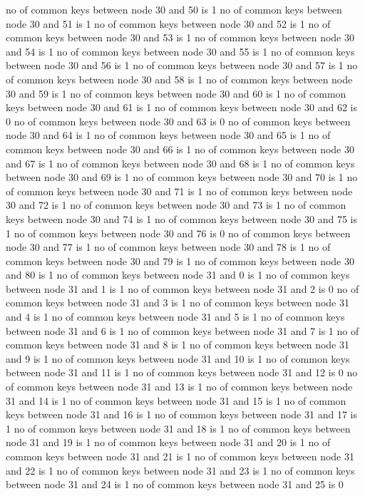 no of common keys between node 30 and 50 is 1
no of common keys between node 30 and 51 is 1
no of common keys between node 30 and 52 is 1
no of common keys between node 30 and 53 is 1
no of common keys between node 30 and 54 is 1
no of common keys between node 30 and 55 is 1
no of common keys between node 30 and 56 is 1
no of common keys between node 30 and 57 is 1
no of common keys between node 30 and 58 is 1
no of common keys between node 30 and 59 is 1
no of common keys between node 30 and 60 is 1
no of common keys between node 30 and 61 is 1
no of common keys between node 30 and 62 is 0
no of common keys between node 30 and 63 is 0
no of common keys between node 30 and 64 is 1
no of common keys between node 30 and 65 is 1
no of common keys between node 30 and 66 is 1
no of common keys between node 30 and 67 is 1
no of common keys between node 30 and 68 is 1
no of common keys between node 30 and 69 is 1
no of common keys between node 30 and 70 is 1
no of common keys between node 30 and 71 is 1
no of common keys between node 30 and 72 is 1
no of common keys between node 30 and 73 is 1
no of common keys between node 30 and 74 is 1
no of common keys between node 30 and 75 is 1
no of common keys between node 30 and 76 is 0
no of common keys between node 30 and 77 is 1
no of common keys between node 30 and 78 is 1
no of common keys between node 30 and 79 is 1
no of common keys between node 30 and 80 is 1
no of common keys between node 31 and 0 is 1
no of common keys between node 31 and 1 is 1
no of common keys between node 31 and 2 is 0
no of common keys between node 31 and 3 is 1
no of common keys between node 31 and 4 is 1
no of common keys between node 31 and 5 is 1
no of common keys between node 31 and 6 is 1
no of common keys between node 31 and 7 is 1
no of common keys between node 31 and 8 is 1
no of common keys between node 31 and 9 is 1
no of common keys between node 31 and 10 is 1
no of common keys between node 31 and 11 is 1
no of common keys between node 31 and 12 is 0
no of common keys between node 31 and 13 is 1
no of common keys between node 31 and 14 is 1
no of common keys between node 31 and 15 is 1
no of common keys between node 31 and 16 is 1
no of common keys between node 31 and 17 is 1
no of common keys between node 31 and 18 is 1
no of common keys between node 31 and 19 is 1
no of common keys between node 31 and 20 is 1
no of common keys between node 31 and 21 is 1
no of common keys between node 31 and 22 is 1
no of common keys between node 31 and 23 is 1
no of common keys between node 31 and 24 is 1
no of common keys between node 31 and 25 is 0
